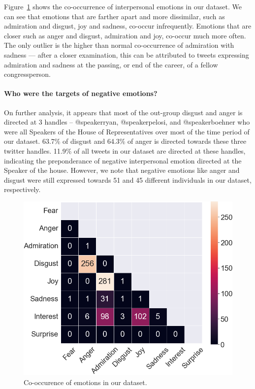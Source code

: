 

Figure~\ref{fig:heatmap} shows the co-occurrence of interpersonal emotions in our dataset. We can see that emotions that are farther apart and more dissimilar, such as admiration and disgust, joy and sadness, co-occur infrequently. Emotions that are closer such as anger and disgust, admiration and joy, co-occur much more often. The only outlier is the higher than normal co-occurrence of admiration with sadness --- after a closer examination, this can be attributed to tweets expressing admiration and sadness at the passing, or end of the career, of a fellow congressperson.

\paragraph{Who were the targets of negative emotions?}

On further analysis, it appears that most of the out-group disgust and anger is directed at 3 handles -- @speakerryan, @speakerpelosi, and @speakerboehner who were all Speakers of the House of Representatives over most of the time period of our dataset. 63.7\% of disgust and 64.3\% of anger is directed towards these three twitter handles. 11.9\% of all tweets in our dataset are directed at these handles, indicating the preponderance of negative interpersonal emotion directed at the Speaker of the house. However, we note that negative emotions like anger and disgust were still expressed towards 51 and 45 different individuals in our dataset, respectively.

\begin{figure}[t]
    \centering
    \includegraphics[width=0.7\linewidth]{figures/heatmap.png}
    \caption{Co-occurence of emotions in our dataset.}
    \label{fig:heatmap}
\end{figure}

